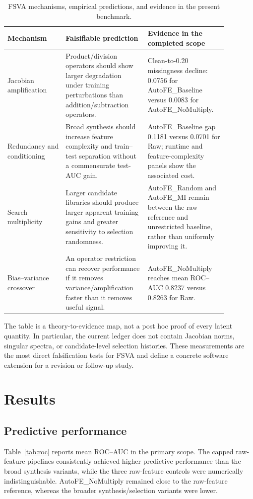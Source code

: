 \documentclass[preprint,12pt]{elsarticle}
\begin{document}
\begin{table}[H]
\centering
\small
\caption{FSVA mechanisms, empirical predictions, and evidence in the present benchmark.}
\label{tab:fsva}
\begin{tabular}{p{0.24\linewidth}p{0.33\linewidth}p{0.31\linewidth}}
\toprule
Mechanism & Falsifiable prediction & Evidence in the completed scope \\
\midrule
Jacobian amplification & Product/division operators should show larger degradation under training perturbations than addition/subtraction operators. & Clean-to-0.20 missingness decline: 0.0756 for AutoFE\_Baseline versus 0.0083 for AutoFE\_NoMultiply. \\
Redundancy and conditioning & Broad synthesis should increase feature complexity and train--test separation without a commensurate test-AUC gain. & AutoFE\_Baseline gap 0.1181 versus 0.0701 for Raw; runtime and feature-complexity panels show the associated cost. \\
Search multiplicity & Larger candidate libraries should produce larger apparent training gains and greater sensitivity to selection randomness. & AutoFE\_Random and AutoFE\_MI remain between the raw reference and unrestricted baseline, rather than uniformly improving it. \\
Bias--variance crossover & An operator restriction can recover performance if it removes variance/amplification faster than it removes useful signal. & AutoFE\_NoMultiply reaches mean ROC--AUC 0.8237 versus 0.8263 for Raw. \\
\bottomrule
\end{tabular}
\end{table}

The table is a theory-to-evidence map, not a post hoc proof of every latent quantity.  In particular, the current ledger does not contain Jacobian norms, singular spectra, or candidate-level selection histories.  These measurements are the most direct falsification tests for FSVA and define a concrete software extension for a revision or follow-up study.

\section{Results}
\label{sec:results}

\subsection{Predictive performance}
Table~\ref{tab:roc} reports mean ROC--AUC in the primary scope.  The capped raw-feature pipelines consistently achieved higher predictive performance than the broad synthesis variants, while the three raw-feature controls were numerically indistinguishable.  AutoFE\_NoMultiply remained close to the raw-feature reference, whereas the broader synthesis/selection variants were lower.
\end{document}
